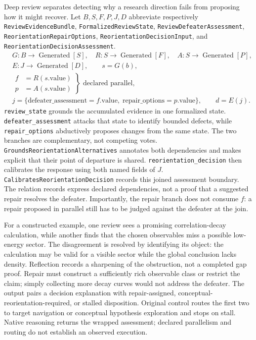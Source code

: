 Deep review separates detecting why a research direction fails from proposing how
it might recover. Let $B,S,F,P,J,D$ abbreviate respectively
\texttt{Review\allowbreak Evidence\allowbreak Bundle}, \texttt{Formalized\allowbreak Review\allowbreak State},
\texttt{Review\allowbreak Defeater\allowbreak Assessment}, \texttt{Reorientation\allowbreak Repair\allowbreak Options},
\texttt{Reorientation\allowbreak Decision\allowbreak Input}, and \texttt{Reorientation\allowbreak Decision\allowbreak Assessment}.
\[
\begin{aligned}
&G:B\to\operatorname{Generated}[S],\quad
 R:S\to\operatorname{Generated}[F],\quad
 A:S\to\operatorname{Generated}[P],\\
&E:J\to\operatorname{Generated}[D],\qquad s=G(b),\\
&\left.\begin{aligned} f&=R(s.\mathrm{value})\\
                        p&=A(s.\mathrm{value})\end{aligned}\right\}
 \text{ declared parallel},\\
&j=\{\mathrm{defeater\_assessment}=f.\mathrm{value},\;
       \mathrm{repair\_options}=p.\mathrm{value}\},\qquad d=E(j).
\end{aligned}
\]
\texttt{review\_\allowbreak state} grounds the accumulated evidence in one formalized state.
\texttt{defeater\_\allowbreak assessment} attacks that state to identify bounded defects,
while \texttt{repair\_\allowbreak options} abductively proposes changes from the same state.
The two branches are complementary, not competing votes.
\texttt{Grounds\allowbreak Reorientation\allowbreak Alternatives} annotates both dependencies and makes
explicit that their point of departure is shared.
\texttt{reorientation\_\allowbreak decision} then calibrates the response using both named
fields of $J$. \texttt{Calibrates\allowbreak Reorientation\allowbreak Decision} records this joined
assessment boundary. The relation records express declared dependencies, not a
proof that a suggested repair resolves the defeater. Importantly, the repair
branch does not consume $f$: a repair proposed in parallel still has to be judged
against the defeater at the join.

For a constructed example, one review sees a promising correlation-decay
calculation, while another finds that the chosen observables miss a possible
low-energy sector. The disagreement is resolved by identifying its object: the
calculation may be valid for a visible sector while the global conclusion lacks
density. Reflection records a sharpening of the obstruction, not a completed gap
proof. Repair must construct a sufficiently rich observable class or restrict the
claim; simply collecting more decay curves would not address the defeater.
The output pairs a decision explanation with repair-assigned,
conceptual-reorientation-required, or stalled disposition. Original control routes
the first two to target navigation or conceptual hypothesis exploration and stops
on stall. Native reasoning returns the wrapped assessment; declared parallelism
and routing do not establish an observed execution.

